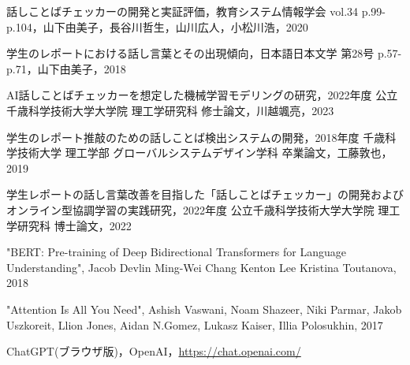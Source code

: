 \clearpage
{} %
\renewcommand{\bibname}{参考文献} %
\begin{thebibliography}{99999}

話しことばチェッカーの開発と実証評価，教育システム情報学会 vol.34 p.99-p.104，山下由美子，長谷川哲生，山川広人，小松川浩，2020

学生のレポートにおける話し言葉とその出現傾向，日本語日本文学 第28号 p.57-p.71，山下由美子，2018

AI話しことばチェッカーを想定した機械学習モデリングの研究，2022年度 公立千歳科学技術大学大学院 理工学研究科 修士論文，川越颯亮，2023

学生のレポート推敲のための話しことば検出システムの開発，2018年度 千歳科学技術大学 理工学部 グローバルシステムデザイン学科 卒業論文，工藤敦也，2019

学生レポートの話し言葉改善を目指した「話しことばチェッカー」の開発およびオンライン型協調学習の実践研究，2022年度 公立千歳科学技術大学大学院 理工学研究科 博士論文，2022

"BERT: Pre-training of Deep Bidirectional Transformers for Language Understanding", Jacob Devlin Ming-Wei Chang Kenton Lee Kristina Toutanova, 2018

"Attention Is All You Need", Ashish Vaswani, Noam Shazeer, Niki Parmar, Jakob Uszkoreit, Llion Jones, Aidan N.Gomez, Lukasz Kaiser, Illia Polosukhin, 2017

ChatGPT(ブラウザ版)，OpenAI，\url{https://chat.openai.com/}

\end{thebibliography}